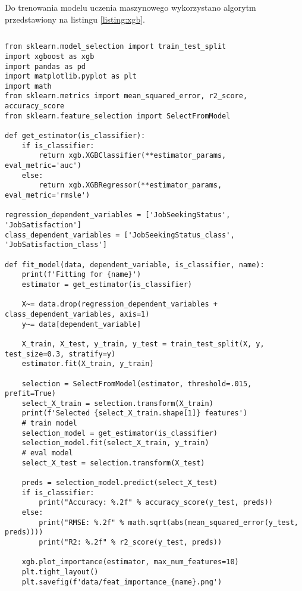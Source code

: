 Do trenowania modelu uczenia maszynowego wykorzystano algorytm przedstawiony na listingu \ref{listing:xgb}.


\noindent\begin{minipage}{\textwidth}
    \begin{lstlisting}[caption={Algorytm uczenia modelu regresji}, label={listing:xgb}]
    \end{lstlisting}
    \hspace{.075\textwidth}\begin{minipage}{.85\textwidth}
        \begin{verbatim}
from sklearn.model_selection import train_test_split
import xgboost as xgb
import pandas as pd
import matplotlib.pyplot as plt
import math
from sklearn.metrics import mean_squared_error, r2_score, accuracy_score
from sklearn.feature_selection import SelectFromModel

def get_estimator(is_classifier):
    if is_classifier:
        return xgb.XGBClassifier(**estimator_params, eval_metric='auc')
    else:
        return xgb.XGBRegressor(**estimator_params, eval_metric='rmsle')

regression_dependent_variables = ['JobSeekingStatus', 'JobSatisfaction']
class_dependent_variables = ['JobSeekingStatus_class', 'JobSatisfaction_class']

def fit_model(data, dependent_variable, is_classifier, name):
    print(f'Fitting for {name}')
    estimator = get_estimator(is_classifier)

    X~= data.drop(regression_dependent_variables + class_dependent_variables, axis=1)
    y~= data[dependent_variable]

    X_train, X_test, y_train, y_test = train_test_split(X, y, test_size=0.3, stratify=y)
    estimator.fit(X_train, y_train)

    selection = SelectFromModel(estimator, threshold=.015, prefit=True)
    select_X_train = selection.transform(X_train)
    print(f'Selected {select_X_train.shape[1]} features')
    # train model
    selection_model = get_estimator(is_classifier)
    selection_model.fit(select_X_train, y_train)
    # eval model
    select_X_test = selection.transform(X_test)

    preds = selection_model.predict(select_X_test)
    if is_classifier:
        print("Accuracy: %.2f" % accuracy_score(y_test, preds))
    else:
        print("RMSE: %.2f" % math.sqrt(abs(mean_squared_error(y_test, preds))))
        print("R2: %.2f" % r2_score(y_test, preds))

    xgb.plot_importance(estimator, max_num_features=10)
    plt.tight_layout()
    plt.savefig(f'data/feat_importance_{name}.png')
        \end{verbatim}
    \end{minipage}

    \raggedright\source{\ownwork}
    \vspace{0.75cm}
\end{minipage}

